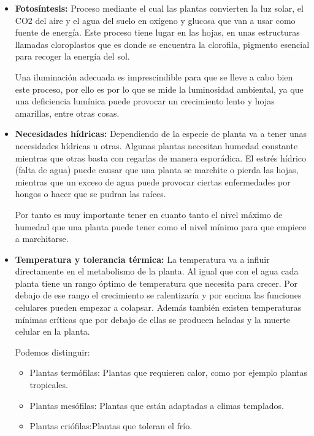 \begin{itemize}
    \item \textbf{Fotosíntesis:} Proceso mediante el cual las plantas convierten la luz solar, el CO2 del aire y el agua del suelo en oxígeno y glucosa que van a usar como fuente de energía. Este proceso tiene lugar en las hojas, en unas estructuras llamadas cloroplastos que es donde se encuentra la clorofila, pigmento esencial para recoger la energía del sol.

    Una iluminación adecuada es imprescindible para que se lleve a cabo bien este proceso, por ello es por lo que se mide la luminosidad ambiental, ya que una deficiencia lumínica puede provocar un crecimiento lento y hojas amarillas, entre otras cosas.

    \item \textbf{Necesidades hídricas:} Dependiendo de la especie de planta va a tener unas necesidades hídricas u otras. Algunas plantas necesitan humedad constante mientras que otras basta con regarlas de manera esporádica. El estrés hídrico (falta de agua) puede causar que una planta se marchite o pierda las hojas, mientras que un exceso de agua puede provocar ciertas enfermedades por hongos o hacer que se pudran las raíces.

    Por tanto es muy importante tener en cuanto tanto el nivel máximo de humedad que una planta puede tener como el nivel mínimo para que empiece a marchitarse.

    \item \textbf{Temperatura y tolerancia térmica:} La temperatura va a influir directamente en el metabolismo de la planta. Al igual que con el agua cada planta tiene un rango óptimo de temperatura que necesita para crecer. Por debajo de ese rango el crecimiento se ralentizaría y por encima las funciones celulares pueden empezar a colapsar. Además también existen temperaturas mínimas críticas que por debajo de ellas se producen heladas y la muerte celular en la planta.

    Podemos distinguir:
    \begin{itemize}
        \item {Plantas termófilas:} Plantas que requieren calor, como por ejemplo plantas tropicales.
        \item {Plantas mesófilas:} Plantas que están adaptadas a climas templados.
        \item {Plantas criófilas:}Plantas que toleran el frío.
    \end{itemize}


\end{itemize}
